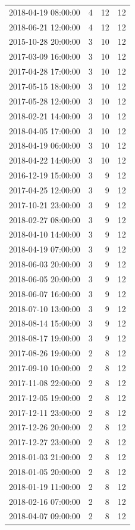 \begin{tabular}{lrrr}
2018-04-19 08:00:00 & 4 & 12 & 12 \\
2018-06-21 12:00:00 & 4 & 12 & 12 \\
2015-10-28 20:00:00 & 3 & 10 & 12 \\
2017-03-09 16:00:00 & 3 & 10 & 12 \\
2017-04-28 17:00:00 & 3 & 10 & 12 \\
2017-05-15 18:00:00 & 3 & 10 & 12 \\
2017-05-28 12:00:00 & 3 & 10 & 12 \\
2018-02-21 14:00:00 & 3 & 10 & 12 \\
2018-04-05 17:00:00 & 3 & 10 & 12 \\
2018-04-19 06:00:00 & 3 & 10 & 12 \\
2018-04-22 14:00:00 & 3 & 10 & 12 \\
2016-12-19 15:00:00 & 3 & 9 & 12 \\
2017-04-25 12:00:00 & 3 & 9 & 12 \\
2017-10-21 23:00:00 & 3 & 9 & 12 \\
2018-02-27 08:00:00 & 3 & 9 & 12 \\
2018-04-10 14:00:00 & 3 & 9 & 12 \\
2018-04-19 07:00:00 & 3 & 9 & 12 \\
2018-06-03 20:00:00 & 3 & 9 & 12 \\
2018-06-05 20:00:00 & 3 & 9 & 12 \\
2018-06-07 16:00:00 & 3 & 9 & 12 \\
2018-07-10 13:00:00 & 3 & 9 & 12 \\
2018-08-14 15:00:00 & 3 & 9 & 12 \\
2018-08-17 19:00:00 & 3 & 9 & 12 \\
2017-08-26 19:00:00 & 2 & 8 & 12 \\
2017-09-10 10:00:00 & 2 & 8 & 12 \\
2017-11-08 22:00:00 & 2 & 8 & 12 \\
2017-12-05 19:00:00 & 2 & 8 & 12 \\
2017-12-11 23:00:00 & 2 & 8 & 12 \\
2017-12-26 20:00:00 & 2 & 8 & 12 \\
2017-12-27 23:00:00 & 2 & 8 & 12 \\
2018-01-03 21:00:00 & 2 & 8 & 12 \\
2018-01-05 20:00:00 & 2 & 8 & 12 \\
2018-01-19 11:00:00 & 2 & 8 & 12 \\
2018-02-16 07:00:00 & 2 & 8 & 12 \\
2018-04-07 09:00:00 & 2 & 8 & 12 \\

\end{tabular}
